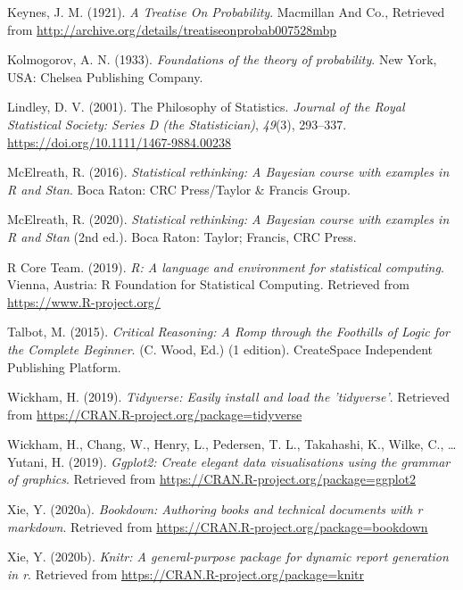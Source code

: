 \documentclass[
  a4paper,11pt,twoside,onecolumn,openright,final,oldfontcommands]{memoir}
\newlength{\cslhangindent}
\newenvironment{cslreferences}%
  {\setlength{\parindent}{0pt}%
  \everypar{\setlength{\hangindent}{\cslhangindent}}\ignorespaces}%
  {\par}
\theoremstyle{definition}
\theoremstyle{definition}
\theoremstyle{definition}
\theoremstyle{remark}
\begin{document}
\begin{cslreferences}
\leavevmode\hypertarget{ref-keynes_treatise_1921}{}%
Keynes, J. M. (1921). \emph{A Treatise On Probability}. Macmillan And Co., Retrieved from \url{http://archive.org/details/treatiseonprobab007528mbp}

\leavevmode\hypertarget{ref-kolmogorov_foundations_1933}{}%
Kolmogorov, A. N. (1933). \emph{Foundations of the theory of probability}. New York, USA: Chelsea Publishing Company.

\leavevmode\hypertarget{ref-lindley_philosophy_2001}{}%
Lindley, D. V. (2001). The Philosophy of Statistics. \emph{Journal of the Royal Statistical Society: Series D (the Statistician)}, \emph{49}(3), 293--337. \url{https://doi.org/10.1111/1467-9884.00238}

\leavevmode\hypertarget{ref-mcelreath_statistical_2016}{}%
McElreath, R. (2016). \emph{Statistical rethinking: A Bayesian course with examples in R and Stan}. Boca Raton: CRC Press/Taylor \& Francis Group.

\leavevmode\hypertarget{ref-mcelreath_statistical_2020}{}%
McElreath, R. (2020). \emph{Statistical rethinking: A Bayesian course with examples in R and Stan} (2nd ed.). Boca Raton: Taylor; Francis, CRC Press.

\leavevmode\hypertarget{ref-R-base}{}%
R Core Team. (2019). \emph{R: A language and environment for statistical computing}. Vienna, Austria: R Foundation for Statistical Computing. Retrieved from \url{https://www.R-project.org/}

\leavevmode\hypertarget{ref-talbot_critical_2015}{}%
Talbot, M. (2015). \emph{Critical Reasoning: A Romp through the Foothills of Logic for the Complete Beginner}. (C. Wood, Ed.) (1 edition). CreateSpace Independent Publishing Platform.

\leavevmode\hypertarget{ref-R-tidyverse}{}%
Wickham, H. (2019). \emph{Tidyverse: Easily install and load the 'tidyverse'}. Retrieved from \url{https://CRAN.R-project.org/package=tidyverse}

\leavevmode\hypertarget{ref-R-ggplot2}{}%
Wickham, H., Chang, W., Henry, L., Pedersen, T. L., Takahashi, K., Wilke, C., \ldots{} Yutani, H. (2019). \emph{Ggplot2: Create elegant data visualisations using the grammar of graphics}. Retrieved from \url{https://CRAN.R-project.org/package=ggplot2}

\leavevmode\hypertarget{ref-R-bookdown}{}%
Xie, Y. (2020a). \emph{Bookdown: Authoring books and technical documents with r markdown}. Retrieved from \url{https://CRAN.R-project.org/package=bookdown}

\leavevmode\hypertarget{ref-R-knitr}{}%
Xie, Y. (2020b). \emph{Knitr: A general-purpose package for dynamic report generation in r}. Retrieved from \url{https://CRAN.R-project.org/package=knitr}
\end{cslreferences}
\end{document}
